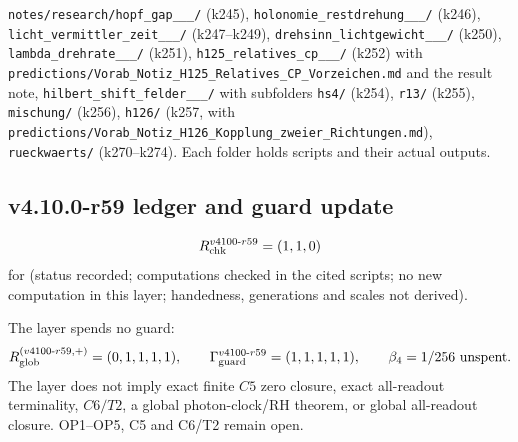 {\raggedright
\texttt{notes/\allowbreak research/\allowbreak hopf\_\allowbreak gap\_\_\_/} (k245),
\texttt{holonomie\_\allowbreak restdrehung\_\_\_/} (k246),
\texttt{licht\_\allowbreak vermittler\_\allowbreak zeit\_\_\_/} (k247--k249),
\texttt{drehsinn\_\allowbreak lichtgewicht\_\_\_/} (k250),
\texttt{lambda\_\allowbreak drehrate\_\_\_/} (k251),
\texttt{h125\_\allowbreak relatives\_\allowbreak cp\_\_\_/} (k252) with
\texttt{predictions/\allowbreak Vorab\_\allowbreak Notiz\_\allowbreak H125\_\allowbreak Relatives\_\allowbreak CP\_\allowbreak Vorzeichen.md} and the result note,
\texttt{hilbert\_\allowbreak shift\_\allowbreak felder\_\_\_/} with subfolders \texttt{hs4/} (k254), \texttt{r13/} (k255),
\texttt{mischung/} (k256), \texttt{h126/} (k257, with \texttt{predictions/\allowbreak Vorab\_\allowbreak Notiz\_\allowbreak H126\_\allowbreak Kopplung\_\allowbreak zweier\_\allowbreak Richtungen.md}),
\texttt{rueckwaerts/} (k270--k274).  Each folder holds scripts and their actual outputs.
\par}

\subsection*{v4.10.0-r59 ledger and guard update}
\label{subsec:v4100-r59-ledger-guard}

\[
R_{\rm chk}^{v4100\text{-}r59}=(1,1,0)
\]
for (status recorded; computations checked in the cited scripts; no new computation in this layer; handedness, generations and scales not derived).

The layer spends no guard:
\[
R_{\rm glob}^{(v4100\text{-}r59,+)}=(0,1,1,1,1),
\qquad
\Gamma_{\rm guard}^{v4100\text{-}r59}=(1,1,1,1,1),
\qquad
\beta_4=1/256\ \text{unspent}.
\]
The layer does not imply exact finite \(C5\) zero closure, exact all-readout terminality, \(C6/T2\), a global photon-clock/RH theorem,
or global all-readout closure.  OP1--OP5, C5 and C6/T2 remain open.
